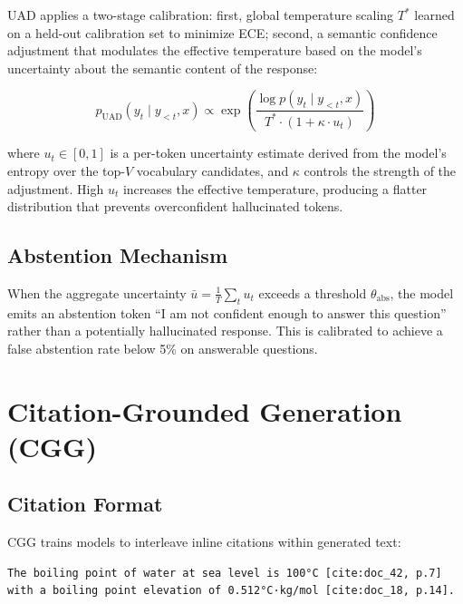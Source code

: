 \documentclass[11pt,a4paper]{article}
\begin{document}
UAD applies a two-stage calibration: first, global temperature scaling $T^*$ learned on
a held-out calibration set to minimize ECE; second, a semantic confidence adjustment that
modulates the effective temperature based on the model's uncertainty about the semantic
content of the response:

\begin{equation}
    p_{\text{UAD}}(y_t \mid y_{<t}, x) \propto
    \exp\!\left(\frac{\log p(y_t \mid y_{<t}, x)}{T^* \cdot (1 + \kappa \cdot u_t)}\right)
    \label{eq:uad}
\end{equation}

where $u_t \in [0,1]$ is a per-token uncertainty estimate derived from the model's
entropy over the top-$V$ vocabulary candidates, and $\kappa$ controls the strength of
the adjustment. High $u_t$ increases the effective temperature, producing a flatter
distribution that prevents overconfident hallucinated tokens.

\subsection{Abstention Mechanism}

When the aggregate uncertainty $\bar{u} = \frac{1}{T}\sum_t u_t$ exceeds a threshold
$\theta_{\text{abs}}$, the model emits an abstention token ``I am not confident enough
to answer this question'' rather than a potentially hallucinated response. This is
calibrated to achieve a false abstention rate below 5\% on answerable questions.

\section{Citation-Grounded Generation (CGG)}
\label{sec:cgg}

\subsection{Citation Format}

CGG trains models to interleave inline citations within generated text:
\begin{verbatim}
The boiling point of water at sea level is 100°C [cite:doc_42, p.7]
with a boiling point elevation of 0.512°C·kg/mol [cite:doc_18, p.14].
\end{verbatim}
\end{document}
